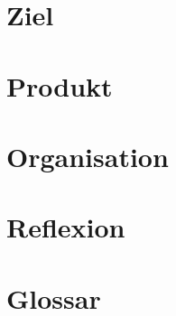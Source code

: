 \documentclass[11pt, oneside, a4paper]{book}
\begin{document}
\pagestyle{empty}

\frontmatter


\tableofcontents

\mainmatter

\part{Ziel}





\part{Produkt}




\part{Organisation}




\part{Reflexion}





% 

\glsaddall
\part{Glossar}
\printglossary
\newpage


\nocite{*}



\end{document}

